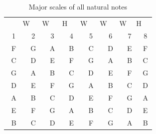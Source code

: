 \begin{table}[h]
	\centering
	\begin{tabular}{*{16}{c}}
		& \multicolumn{2}{P{4mm}}{\large{W}} & \multicolumn{2}{P{4mm}}{\large{W}} & \multicolumn{2}{P{4mm}}{\large{H}} & \multicolumn{2}{P{4mm}}{\large{W}} & \multicolumn{2}{P{4mm}}{\large{W}} & \multicolumn{2}{P{4mm}}{\large{W}} & \multicolumn{2}{P{4mm}}{\large{H}} & \\
		\multicolumn{2}{P{4mm}}{1} & \multicolumn{2}{P{4mm}}{2} & \multicolumn{2}{P{4mm}}{3} & \multicolumn{2}{P{4mm}}{4} & \multicolumn{2}{P{4mm}}{5} & \multicolumn{2}{P{4mm}}{6} & \multicolumn{2}{P{4mm}}{7} & \multicolumn{2}{P{4mm}}{8} \\
		\multicolumn{2}{P{4mm}}{F} & \multicolumn{2}{P{4mm}}{G} & \multicolumn{2}{P{4mm}}{A} & \multicolumn{2}{P{4mm}}{B\flat} & \multicolumn{2}{P{4mm}}{C} & \multicolumn{2}{P{4mm}}{D} & \multicolumn{2}{P{4mm}}{E} & \multicolumn{2}{P{4mm}}{F} \\
		\multicolumn{2}{P{4mm}}{C} & \multicolumn{2}{P{4mm}}{D} & \multicolumn{2}{P{4mm}}{E} & \multicolumn{2}{P{4mm}}{F} & \multicolumn{2}{P{4mm}}{G} & \multicolumn{2}{P{4mm}}{A} & \multicolumn{2}{P{4mm}}{B} & \multicolumn{2}{P{4mm}}{C} \\
		\multicolumn{2}{P{4mm}}{G} & \multicolumn{2}{P{4mm}}{A} & \multicolumn{2}{P{4mm}}{B} & \multicolumn{2}{P{4mm}}{C} & \multicolumn{2}{P{4mm}}{D} & \multicolumn{2}{P{4mm}}{E} & \multicolumn{2}{P{4mm}}{F\sharp} & \multicolumn{2}{P{4mm}}{G} \\
		\multicolumn{2}{P{4mm}}{D} & \multicolumn{2}{P{4mm}}{E} & \multicolumn{2}{P{4mm}}{F\sharp} & \multicolumn{2}{P{4mm}}{G} & \multicolumn{2}{P{4mm}}{A} & \multicolumn{2}{P{4mm}}{B} & \multicolumn{2}{P{4mm}}{C\sharp} & \multicolumn{2}{P{4mm}}{D} \\
		\multicolumn{2}{P{4mm}}{A} & \multicolumn{2}{P{4mm}}{B} & \multicolumn{2}{P{4mm}}{C\sharp} & \multicolumn{2}{P{4mm}}{D} & \multicolumn{2}{P{4mm}}{E} & \multicolumn{2}{P{4mm}}{F\sharp} & \multicolumn{2}{P{4mm}}{G\sharp} & \multicolumn{2}{P{4mm}}{A} \\
		\multicolumn{2}{P{4mm}}{E} & \multicolumn{2}{P{4mm}}{F\sharp} & \multicolumn{2}{P{4mm}}{G\sharp} & \multicolumn{2}{P{4mm}}{A} & \multicolumn{2}{P{4mm}}{B} & \multicolumn{2}{P{4mm}}{C\sharp} & \multicolumn{2}{P{4mm}}{D\sharp} & \multicolumn{2}{P{4mm}}{E} \\
		\multicolumn{2}{P{4mm}}{B} & \multicolumn{2}{P{4mm}}{C\sharp} & \multicolumn{2}{P{4mm}}{D\sharp} & \multicolumn{2}{P{4mm}}{E} & \multicolumn{2}{P{4mm}}{F\sharp} & \multicolumn{2}{P{4mm}}{G\sharp} & \multicolumn{2}{P{4mm}}{A\sharp} & \multicolumn{2}{P{4mm}}{B}
	\end{tabular}
	\caption{Major scales of all natural notes}
	\label{tab:ukulele_natural_note_major_scale}
\end{table}

